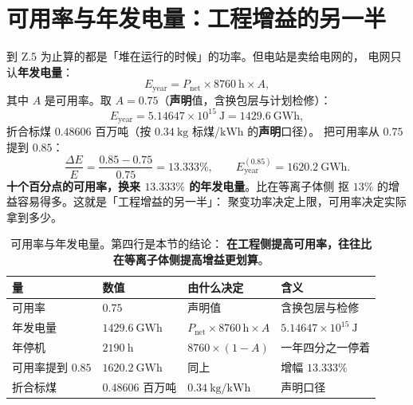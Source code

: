 \section{可用率与年发电量：工程增益的另一半}
\label{sec:app-z-availability}

到 Z.5 为止算的都是「堆在运行的时候」的功率。但电站是卖给电网的，
电网只认\textbf{年发电量}：
\begin{equation}
E_{\mathrm{year}} = P_{\mathrm{net}}\times 8760\ \mathrm{h}\times A,
\label{eq:app-z-eyear}
\end{equation}
其中 $A$ 是可用率。取 $A=0.75$（\textbf{声明}值，含换包层与计划检修）：
\begin{equation}
E_{\mathrm{year}} = 5.14647\times10^{15}\ \mathrm{J} = 1429.6\ \mathrm{GWh},
\label{eq:app-z-eyearnum}
\end{equation}
折合标煤 $0.48606$ 百万吨（按 $0.34\ \mathrm{kg}$ 标煤/$\mathrm{kWh}$ 的\textbf{声明}口径）。
把可用率从 $0.75$ 提到 $0.85$：
\begin{equation}
\frac{\Delta E}{E} = \frac{0.85-0.75}{0.75} = 13.333\%,
\qquad
E_{\mathrm{year}}^{(0.85)} = 1620.2\ \mathrm{GWh}.
\label{eq:app-z-gain85}
\end{equation}
\textbf{十个百分点的可用率，换来 $13.333\%$ 的年发电量}。比在等离子体侧
抠 $13\%$ 的增益容易得多。这就是「工程增益的另一半」：
聚变功率决定上限，可用率决定实际拿到多少。

\begin{table}[htbp]
\centering
\small
\caption{可用率与年发电量。第四行是本节的结论：
\textbf{在工程侧提高可用率，往往比在等离子体侧提高增益更划算}。}
\label{tab:app-z-availability}
\begin{tabular}{p{3.4cm}p{3.2cm}p{3.2cm}p{3.3cm}}
\toprule
量 & 数值 & 由什么决定 & 含义 \\
\midrule
可用率 & $0.75$ & 声明值 & 含换包层与检修 \\
年发电量 & $1429.6\ \mathrm{GWh}$ & $P_{\mathrm{net}}\times8760\,\mathrm{h}\times A$ & $5.14647\times10^{15}\ \mathrm{J}$ \\
年停机 & $2190\ \mathrm{h}$ & $8760\times(1-A)$ & 一年四分之一停着 \\
可用率提到 $0.85$ & $1620.2\ \mathrm{GWh}$ & 同上 & 增幅 $13.333\%$ \\
折合标煤 & $0.48606$ 百万吨 & $0.34\ \mathrm{kg/kWh}$ & 声明口径 \\
\bottomrule
\end{tabular}

\end{table}

